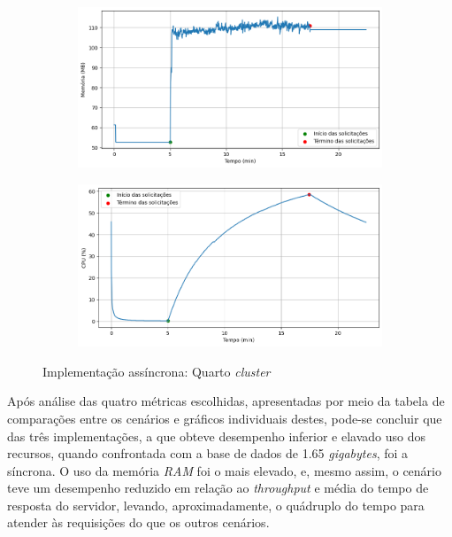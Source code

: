 \documentclass[12pt]{article}
\begin{document}
\begin{figure}[H]
		\centering
		\begin{subfigure}[H]{0.45\textwidth}
				\centering
				\label{fig:async-cluster_usage_3a}
				\includegraphics[width=1\textwidth]{images/pt-br/results/async-cluster_memory_usage_3.png}
		\end{subfigure}
		\hfill%
		\begin{subfigure}[H]{0.45\textwidth}
				\centering
				\label{fig:async-cluster_usage_3b}
				\includegraphics[width=1\textwidth]{images/pt-br/results/async-cluster_cpu_usage_3.png}
		\end{subfigure}
		
		\caption{Implementação assíncrona: Quarto \textit{cluster}}\label{fig:async-cluster_usage_3}
\end{figure}

Após análise das quatro métricas escolhidas, apresentadas por meio da tabela de comparações
entre os cenários e gráficos individuais destes, pode-se concluir que das três 
implementações, a que obteve desempenho inferior e elavado uso dos recursos, quando confrontada 
com a base de dados de 1.65 \textit{gigabytes}, foi a síncrona. O uso da memória \textit{RAM}
foi o mais elevado, e, mesmo assim, o cenário teve um desempenho reduzido em relação ao 
\textit{throughput} e média do tempo de resposta do servidor, levando, aproximadamente,
o quádruplo do tempo para atender às requisições do que os outros cenários.
\end{document}

